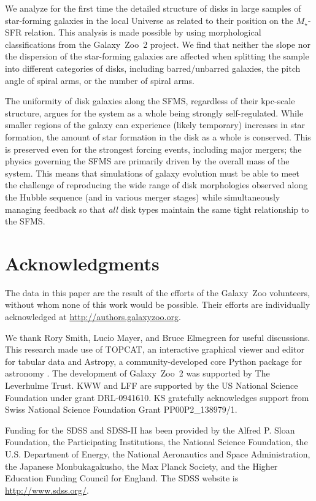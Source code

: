 \documentclass[useAMS,usenatbib]{mn2e}
\begin{document}
We analyze for the first time the detailed structure of disks in large samples of star-forming galaxies in the local Universe as related to their position on the $M_\star$-SFR relation. This analysis is made possible by using morphological classifications from the Galaxy~Zoo~2 project. We find that neither the slope nor the dispersion of the star-forming galaxies are affected when splitting the sample into different categories of disks, including barred/unbarred galaxies, the pitch angle of spiral arms, or the number of spiral arms. 

The uniformity of disk galaxies along the SFMS, regardless of their kpc-scale structure, argues for the system as a whole being strongly self-regulated. While smaller regions of the galaxy can experience (likely temporary) increases in star formation, the amount of star formation in the disk as a whole is conserved. This is preserved even for the strongest forcing events, including major mergers; the physics governing the SFMS are primarily driven by the overall mass of the system. This means that simulations of galaxy evolution must be able to meet the challenge of reproducing the wide range of disk morphologies observed along the Hubble sequence (and in various merger stages) while simultaneously managing feedback so that \emph{all} disk types maintain the same tight relationship to the SFMS.


\section*{Acknowledgments}

The data in this paper are the result of the efforts of the Galaxy~Zoo volunteers, without whom none of this work would be possible. Their efforts are individually acknowledged at \url{http://authors.galaxyzoo.org}. 

We thank Rory Smith, Lucio Mayer, and Bruce Elmegreen for useful discussions. This research made use of TOPCAT, an interactive graphical viewer and editor for tabular data \citep{tay05} and Astropy, a community-developed core Python package for astronomy \citep{ast13}. The development of Galaxy~Zoo~2 was supported by The Leverhulme Trust. KWW and LFF are supported by the US National Science Foundation under grant DRL-0941610. KS gratefully acknowledges support from Swiss National Science Foundation Grant PP00P2\_138979/1.

Funding for the SDSS and SDSS-II has been provided by the Alfred P. Sloan Foundation, the Participating Institutions, the National Science Foundation, the U.S. Department of Energy, the National Aeronautics and Space Administration, the Japanese Monbukagakusho, the Max Planck Society, and the Higher Education Funding Council for England. The SDSS website is \url{http://www.sdss.org/}.
\end{document}

